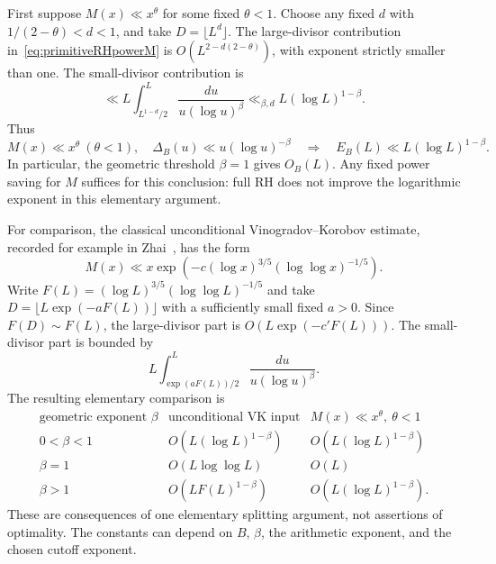 First suppose $M(x)\ll x^\theta$ for some fixed $\theta<1$.
Choose any fixed $d$ with
$1/(2-\theta)<d<1$, and take $D=\lfloor L^d\rfloor$.
The large-divisor contribution in~\eqref{eq:primitiveRHpowerM} is
$O(L^{2-d(2-\theta)})$, with exponent strictly smaller than one.
The small-divisor contribution is
\[
 \ll L\int_{L^{1-d}/2}^L\frac{du}{u(\log u)^\beta}
 \ll_{\beta,d} L(\log L)^{1-\beta}.
\]
Thus
\begin{equation}\label{eq:primitiveRHlogresult}
 M(x)\ll x^\theta\ (\theta<1),\quad
 \Delta_B(u)\ll u(\log u)^{-\beta}
 \quad\Longrightarrow\quad
 E_B(L)\ll L(\log L)^{1-\beta}.
\end{equation}
In particular, the geometric threshold $\beta=1$ gives $O_B(L)$.
Any fixed power saving for $M$ suffices for this conclusion: full RH
does not improve the logarithmic exponent in this elementary argument.

For comparison, the classical unconditional Vinogradov--Korobov estimate,
recorded for example in Zhai~\cite[eq.~(1.5)]{ZhaiPrimitive2003}, has the form
\[
 M(x)\ll x\exp\!\left(-c(\log x)^{3/5}
                              (\log\log x)^{-1/5}\right).
\]
Write $F(L)=(\log L)^{3/5}(\log\log L)^{-1/5}$ and take
$D=\lfloor L\exp(-aF(L))\rfloor$ with a sufficiently small fixed
$a>0$.  Since $F(D)\sim F(L)$, the large-divisor part is
$O(L\exp(-c'F(L)))$.  The small-divisor part is bounded by
\[
 L\int_{\exp(aF(L))/2}^L\frac{du}{u(\log u)^\beta}.
\]
The resulting elementary comparison is
\[
\begin{array}{c|c|c}
 \text{geometric exponent }\beta
 &\text{unconditional VK input}
 &M(x)\ll x^\theta,\ \theta<1\\ \hline
 0<\beta<1
 &O\!\left(L(\log L)^{1-\beta}\right)
 &O\!\left(L(\log L)^{1-\beta}\right)\\[2pt]
 \beta=1
 &O(L\log\log L)
 &O(L)\\[2pt]
 \beta>1
 &O\!\left(LF(L)^{1-\beta}\right)
 &O\!\left(L(\log L)^{1-\beta}\right).
\end{array}
\]
These are consequences of one elementary splitting argument, not
assertions of optimality.  The constants can depend on $B$, $\beta$,
the arithmetic exponent, and the chosen cutoff exponent.

